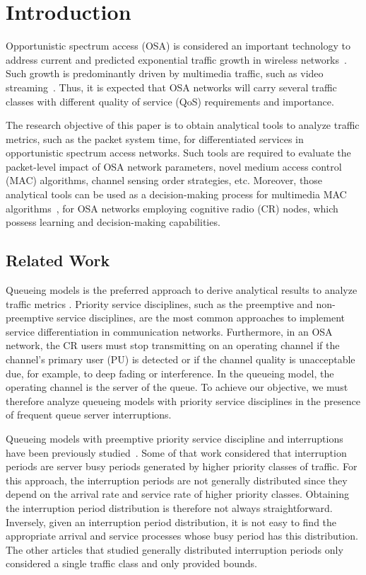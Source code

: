 \documentclass[11pt,journal,oneside,onecolumn,draftclsnofoot]{IEEEtran}
\begin{document}
\section{Introduction}
\label {sec:intro}

Opportunistic spectrum access (OSA) is considered  an important technology to address current and predicted exponential traffic growth in wireless networks~\cite{jondral07,mitola09,xiao13,cisco13}. Such growth is predominantly driven by multimedia traffic, such as video streaming~\cite{cisco13}. Thus, it is expected that OSA networks will carry several traffic classes with different quality of service (QoS) requirements and importance.

The research objective of this paper is to obtain analytical tools to analyze traffic metrics, such as the packet system time, for differentiated services in opportunistic spectrum access networks. Such tools are required to evaluate the packet-level impact of OSA network parameters, novel medium access control (MAC) algorithms, channel sensing order strategies, etc. Moreover, those analytical tools can be used as a decision-making process for multimedia MAC algorithms~\cite{azarfar12b}, for OSA networks employing cognitive radio (CR) nodes, which possess learning and decision-making capabilities.

\subsection{Related Work}

Queueing models is the preferred approach to derive analytical results to analyze traffic metrics \cite{wang-l11}. Priority service disciplines, such as the preemptive and non-preemptive service disciplines, are the most common approaches to implement service differentiation in communication networks.
Furthermore, in an OSA network, the CR users must stop transmitting on an operating channel if the channel's primary user (PU) is detected or if the channel quality is unacceptable due, for example, to deep fading or interference. In the queueing model, the operating channel is the server of the queue. To achieve our objective, we must therefore analyze queueing models with priority service disciplines in the presence of frequent queue server interruptions. 

Queueing models with preemptive priority service discipline and interruptions have been previously studied~\cite{federgruen86,avi-itzhak63,takagi91,gaver62,fiems08}. Some of that work considered that interruption periods are server busy periods generated by higher priority classes of traffic. For this approach, the interruption periods are not generally distributed since they depend on the arrival rate and service rate of higher priority classes. Obtaining the interruption period distribution is therefore not always straightforward. Inversely, given an interruption period distribution, it is not easy to find the appropriate arrival and service processes whose busy period has this distribution. The other articles that studied generally distributed interruption periods only considered a single traffic class and only provided bounds.
\end{document}
